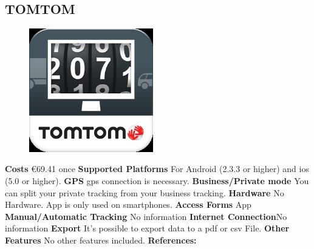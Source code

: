 \begin{singlespace}
\section{TOMTOM}
\begin{figure}
  \begin{center}
    \includegraphics[width=0.48\textwidth]{bilder/tomtom}
  \end{center}
\end{figure}
\textbf{Costs} \euro 69.41 once\newline\newline
\textbf{Supported Platforms} For Android (2.3.3 or higher) and \gls{ios} (5.0 or higher).\newline\newline
\textbf{GPS} \gls{gps} connection is necessary.\newline\newline
\textbf{Business/Private mode} You can split your private tracking from your business tracking.\newline\newline
\textbf{Hardware} No Hardware. App is only used on smartphones.\newline\newline
\textbf{Access Forms} App\newline\newline
\textbf{Manual/Automatic Tracking} No information\newline\newline
\textbf{Internet Connection}No information
\textbf{Export} It’s possible to export data to a \gls{pdf} or \gls{csv} File.\newline\newline
\textbf{Other Features} No other features included.\newline\newline
\textbf{References:} \cite{Electronic_Logbook_from_TOMTOM}\newline\newline
\newpage
\clearpageauthor

\end{singlespace}
